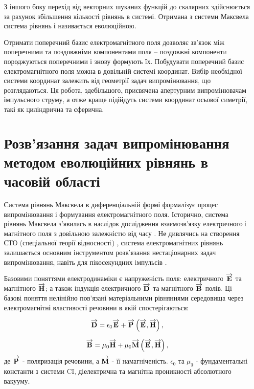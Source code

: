 З іншого боку перехід від векторних шуканих функцій до скалярних здійснюється
за рахунок збільшення кількості рівнянь в системі. Отримана з системи Максвела
система рівнянь і називається еволюційною.

Отримати поперечний базис електромагнітного поля дозволяє зв'язок між 
поперечними та поздовжніми компонентами поля -- поздовжні компоненти 
породжуються поперечними і знову формують їх. 
Побудувати поперечний базис електромагнітного поля можна в довільній системі 
координат. Вибір необхідної системи координат залежить від геометрії задач 
випромінювання, що розглядаються. Ця робота, здебільшого, присвячена 
апертурним випромінювачам імпульсного струму, а отже краще підійдуть 
системи координат осьової симетрії, такі як циліндрична та сферична.

\section{Розв'язання задач випромінювання методом еволюційних рівнянь
в часовій області}

Система рівнянь Максвела в диференціальній формі формалізує процес
випромінювання і формування електромагнітного поля. Історично, система рівнянь 
Максвела з'явилась в наслідок дослідження взаємозв'язку електричного і 
магнітного поля з довільною залежністю від часу \cite{imp:Maxwell1865}.
Не дивлячись на створення СТО (спеціальної теорії відносності) 
\cite{imp:Einstein1905}, система електромагнітних рівнянь залишається основним
інструментом розв'язання нестаціонарних задач випромінювання, навіть для 
пікосекундних імпульсів \cite{imp:Bray2006}.

Базовими поняттями електродинаміки є напруженість поля: електричного 
$ \overrightarrow{\mathbf E} $ та магнітного $ \overrightarrow{\mathbf H} $; а також індукція електричного 
$ \overrightarrow{\mathbf D} $ та магнітного $ \overrightarrow{\mathbf B} $ полів. Ці базові поняття нелінійно 
пов'язані матеріальними рівняннями середовища через електромагнітні 
властивості речовини в якій спостерігаються:

\begin{equation} \label{eq:MInduct}
\overrightarrow{\mathbf D} = \epsilon_0 \overrightarrow{\mathbf E} + \overrightarrow{\mathbf P} \left( \overrightarrow{\mathbf E},\overrightarrow{\mathbf H} \right),
\end{equation}

\begin{equation} \label{eq:EInduct} 
\overrightarrow{\mathbf B} = \mu_0 \overrightarrow{\mathbf H} + \mu_0 \overrightarrow{\mathbf M} \left( \overrightarrow{\mathbf E},\overrightarrow{\mathbf H} \right),
\end{equation}
%
де $ \overrightarrow{\mathbf P} $ - поляризація речовини, а $ \overrightarrow{\mathbf M} $ - її намагніченість.
$ \epsilon_0 $ та $ \mu_0 $ - фундаментальні константи з системи CI, 
діелектрична та магнітна проникності абсолютного вакууму.

